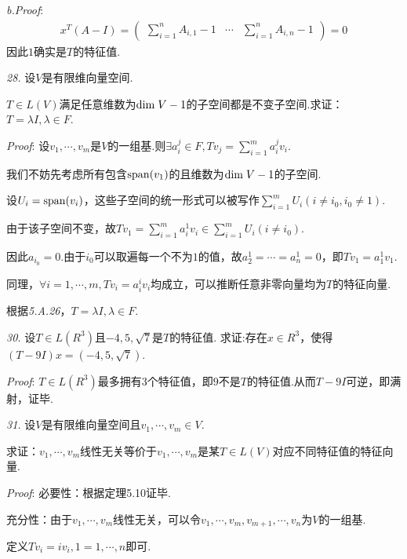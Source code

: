 \textit{b.Proof}:
    \begin{align*}
        x^T(A-I)=
            \begin{pmatrix}
                \sum_{i=1}^n A_{i,1}-1 & \cdots & \sum_{i=1}^n A_{i,n}-1
            \end{pmatrix}
                =0
    \end{align*}
因此$1$确实是$T$的特征值.

\hspace*{\fill}

\textit{28.}
设$V$是有限维向量空间.

$T \in L(V)$满足任意维数为$\mathrm{dim \;} V-1$的子空间都是不变子空间.求证：$T=\lambda I,\lambda \in F$.

\textit{Proof}:
设$v_1,\cdots,v_m$是$V$的一组基.则$\exists a_i^j \in F,Tv_j=\sum_{i=1}^m a_i^j v_i$.

我们不妨先考虑所有包含$\mathrm{span} (v_1)$的且维数为$\mathrm{dim \;} V-1$的子空间.

设$U_i=\mathrm{span} (v_i)$，这些子空间的统一形式可以被写作$\sum_{i=1}^m U_i(i \ne i_0,i_0 \ne 1)$.

由于该子空间不变，故$Tv_1=\sum_{i=1}^m a_i^1 v_i \in \sum_{i=1}^m U_i(i \ne i_0)$.

因此$a_{i_0}=0$.由于$i_0$可以取遍每一个不为$1$的值，故$a_2^1=\cdots=a_n^1=0$，即$Tv_1=a_1^1 v_1$.

同理，$\forall i=1,\cdots,m,Tv_i=a_i^i v_i$均成立，可以推断任意非零向量均为$T$的特征向量.

根据\textit{5.A.26}，$T=\lambda I,\lambda \in F$.

\hspace*{\fill}

\textit{30.}
设$T \in L(R^3)$且$-4,5,\sqrt{7}$是$T$的特征值.
求证:存在$x \in R^3$，使得$(T-9I)x=(-4,5,\sqrt{7})$.

\textit{Proof}:
$T \in L(R^3)$最多拥有$3$个特征值，即$9$不是$T$的特征值.从而$T-9I$可逆，即满射，证毕.

\newpage

\textit{31.}
设$V$是有限维向量空间且$v_1,\cdots,v_m \in V$.

求证：$v_1,\cdots,v_m$线性无关等价于$v_1,\cdots,v_m$是某$T \in L(V)$对应不同特征值的特征向量.

\textit{Proof}:
必要性：根据定理5.10证毕.

充分性：由于$v_1,\cdots,v_m$线性无关，可以令$v_1,\cdots,v_m,v_{m+1},\cdots,v_n$为$V$的一组基.

定义$Tv_i=iv_i,1=1,\cdots,n$即可.

